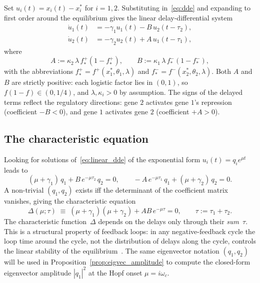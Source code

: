 \documentclass[sn-mathphys,Numbered]{sn-jnl}
\theoremstyle{thmstyleone}
\theoremstyle{thmstyletwo}
\theoremstyle{thmstylethree}
\begin{document}
Set $u_i(t)=x_i(t)-x_i^*$ for $i=1,2$. Substituting in~\eqref{eq:dde} and
expanding to first order around the equilibrium gives the linear
delay-differential system
\begin{equation}
\begin{aligned}
\dot{u}_1(t) &= -\gamma_1 u_1(t) - B\,u_2(t-\tau_2),\\
\dot{u}_2(t) &= -\gamma_2 u_2(t) + A\,u_1(t-\tau_1),
\end{aligned}
\label{eq:linear_dde}
\end{equation}
where
\begin{equation}
A := \kappa_2\,\lambda\,f^+_*(1-f^+_*),
\qquad
B := \kappa_1\,\lambda\,f^-_*(1-f^-_*),
\label{eq:AB_def}
\end{equation}
with the abbreviations
$f^+_* = f^+(x_1^*,\theta_1,\lambda)$ and
$f^-_* = f^-(x_2^*,\theta_2,\lambda)$. Both $A$ and $B$ are strictly
positive: each logistic factor lies in $(0,1)$, so $f(1-f)\in(0,1/4)$, and
$\lambda,\kappa_i>0$ by assumption. The signs of the delayed terms reflect
the regulatory directions: gene $2$ activates gene $1$'s repression
(coefficient $-B<0$), and gene $1$ activates gene $2$ (coefficient
$+A>0$).

\subsection{The characteristic equation}

Looking for solutions of~\eqref{eq:linear_dde} of the exponential form
$u_i(t) = q_i e^{\mu t}$ leads to
\[
(\mu+\gamma_1)\,q_1 + B\,e^{-\mu\tau_2}\,q_2 = 0,
\qquad
-A\,e^{-\mu\tau_1}\,q_1 + (\mu+\gamma_2)\,q_2 = 0.
\]
A non-trivial $(q_1,q_2)$ exists iff the determinant of the coefficient
matrix vanishes, giving the characteristic equation
\begin{equation}
\Delta(\mu;\tau)
\;\equiv\;
(\mu+\gamma_1)(\mu+\gamma_2) + AB\,e^{-\mu\tau} = 0,
\qquad \tau := \tau_1+\tau_2.
\label{eq:char_eq}
\end{equation}
The characteristic function~$\Delta$ depends on the delays only through
their \emph{sum}~$\tau$. This is a structural property of feedback loops:
in any negative-feedback cycle the loop time around the cycle, not the
distribution of delays along the cycle, controls the linear stability of
the equilibrium~\cite[Thm.~5.5.1]{kuang1993delay}. The same eigenvector
notation $(q_1,q_2)$ will be used in Proposition~\ref{prop:eigvec_amplitude}
to compute the closed-form eigenvector amplitude $|q_1|^{2}$ at the
Hopf onset $\mu=i\omega_c$.
\end{document}
